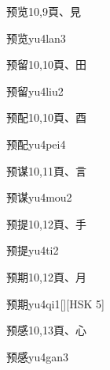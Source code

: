 \begin{entry}{预览}{10,9}{⾴、⾒}
  \begin{phonetics}{预览}{yu4lan3}
  \end{phonetics}
\end{entry}

\begin{entry}{预留}{10,10}{⾴、⽥}
  \begin{phonetics}{预留}{yu4liu2}
  \end{phonetics}
\end{entry}

\begin{entry}{预配}{10,10}{⾴、⾣}
  \begin{phonetics}{预配}{yu4pei4}
  \end{phonetics}
\end{entry}

\begin{entry}{预谋}{10,11}{⾴、⾔}
  \begin{phonetics}{预谋}{yu4mou2}
  \end{phonetics}
\end{entry}

\begin{entry}{预提}{10,12}{⾴、⼿}
  \begin{phonetics}{预提}{yu4ti2}
  \end{phonetics}
\end{entry}

\begin{entry}{预期}{10,12}{⾴、⽉}
  \begin{phonetics}{预期}{yu4qi1}[][HSK 5]
  \end{phonetics}
\end{entry}

\begin{entry}{预感}{10,13}{⾴、⼼}
  \begin{phonetics}{预感}{yu4gan3}
  \end{phonetics}
\end{entry}

